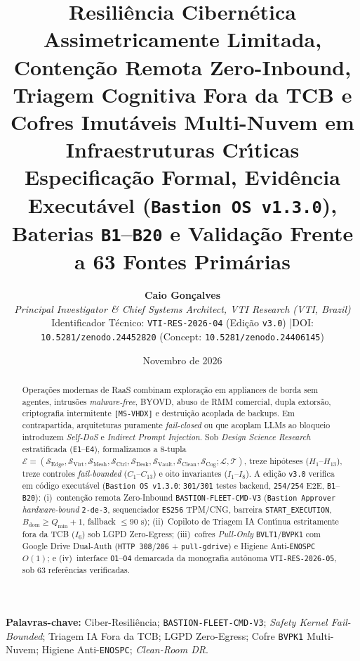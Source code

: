 \documentclass[10pt,twocolumn]{article}
\title{\Large\bfseries Resili\^{e}ncia Cibern\'{e}tica Assimetricamente Limitada, Conten\c{c}\~{a}o Remota Zero-Inbound, Triagem Cognitiva Fora da TCB e Cofres Imut\'{a}veis Multi-Nuvem em Infraestruturas Cr\'{\i}ticas\\[0.25em]
\large Especifica\c{c}\~{a}o Formal, Evid\^{e}ncia Execut\'{a}vel (\texttt{Bastion OS v1.3.0}), Baterias \texttt{B1}--\texttt{B20} e Valida\c{c}\~{a}o Frente a 63 Fontes Prim\'{a}rias}
\author{%
  \textbf{Caio Gon\c{c}alves}\\
  \textit{Principal Investigator \& Chief Systems Architect, VTI Research (VTI, Brazil)}\\
  \small Identificador T\'{e}cnico: \texttt{VTI-RES-2026-04} (Edi\c{c}\~{a}o \texttt{v3.0}) \quad|\quad DOI: \texttt{10.5281/zenodo.24452820} (Concept: \texttt{10.5281/zenodo.24406145})
}
\date{Novembro de 2026}
\begin{document}
\nocite{R01,R02,R03,R04,R05,R06,R07,R08,R09,R10,R11,R12,R13,R14,R15,R16,R17,R18,R19,R20,R21,R22,R23,R24,R25,R26,R27,R28,R29,R30,R31,R32,R33,R34,R35,R36,R37,R38,R39,R40,R41,R42,R43,R44,R45,R46,R47,R48,R49,R50,R51,R52,R53,R54,R55,R56,R57,R58,R59,R60,R61,R62,R63}

\maketitle

\begin{abstract}
\noindent Opera\c{c}\~{o}es modernas de RaaS combinam explora\c{c}\~{a}o em appliances de borda sem agentes, intrus\~{o}es \emph{malware-free}, BYOVD, abuso de RMM comercial, dupla extors\~{a}o, criptografia intermitente \texttt{[MS-VHDX]} e destrui\c{c}\~{a}o acoplada de backups. Em contrapartida, arquiteturas puramente \emph{fail-closed} ou que acoplam LLMs ao bloqueio introduzem \emph{Self-DoS} e \emph{Indirect Prompt Injection}. Sob \emph{Design Science Research} estratificada (\texttt{E1}--\texttt{E4}), formalizamos a 8-tupla $\mathcal{E} = (\mathcal{S}_{\mathrm{Edge}}, \mathcal{S}_{\mathrm{Virt}}, \mathcal{S}_{\mathrm{Mesh}}, \mathcal{S}_{\mathrm{Ctrl}}, \mathcal{S}_{\mathrm{Desk}}, \mathcal{S}_{\mathrm{Vault}}, \mathcal{S}_{\mathrm{Clean}}, \mathcal{S}_{\mathrm{Cog}}; \mathcal{L}, \mathcal{T})$, treze hip\'{o}teses ($H_1$--$H_{13}$), treze controles \emph{fail-bounded} ($C_1$--$C_{13}$) e oito invariantes ($I_1$--$I_8$). A edi\c{c}\~{a}o \texttt{v3.0} verifica em c\'{o}digo execut\'{a}vel (\texttt{Bastion OS v1.3.0}: \texttt{301/301} testes backend, \texttt{254/254} E2E, \texttt{B1}--\texttt{B20}): (i)~conten\c{c}\~{a}o remota Zero-Inbound \texttt{BASTION-FLEET-CMD-V3} (\texttt{Bastion Approver} \emph{hardware-bound} \texttt{2-de-3}, sequenciador \texttt{ES256} TPM/CNG, barreira \texttt{START\_EXECUTION}, $B_{\mathrm{dom}} \ge Q_{\min}+1$, fallback $\le 90\text{ s}$); (ii)~Copiloto de Triagem IA Cont\'{\i}nua estritamente fora da TCB ($I_6$) sob LGPD Zero-Egress; (iii)~cofres \emph{Pull-Only} \texttt{BVLT1}/\texttt{BVPK1} com Google Drive Dual-Auth (\texttt{HTTP 308}/\texttt{206} + \texttt{pull-gdrive}) e Higiene Anti-\texttt{ENOSPC} $O(1)$; e (iv)~interface \texttt{O1}--\texttt{O4} demarcada da monografia aut\^{o}noma \texttt{VTI-RES-2026-05}, sob 63 refer\^{e}ncias verificadas.
\end{abstract}

\vspace{0.4em}
\noindent\textbf{Palavras-chave:} Ciber-Resili\^{e}ncia; \texttt{BASTION-FLEET-CMD-V3}; \emph{Safety Kernel Fail-Bounded}; Triagem IA Fora da TCB; LGPD Zero-Egress; Cofre \texttt{BVPK1} Multi-Nuvem; Higiene Anti-\texttt{ENOSPC}; \emph{Clean-Room DR}.
\end{document}
